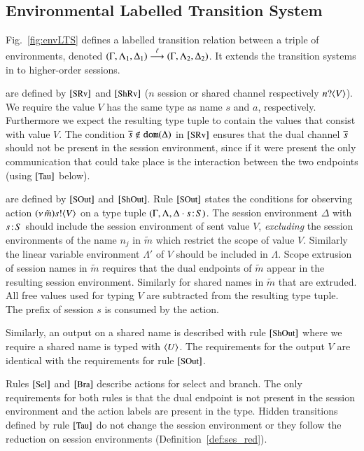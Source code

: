 \subsection{Environmental Labelled Transition System}
\label{ss:elts}
\noi 
Fig.~\ref{fig:envLTS}
defines a labelled transition relation between 
a triple of environments, 
denoted
$(\Gamma, \Lambda_1, \Delta_1) \stackrel{\ell}{\longrightarrow} (\Gamma, \Lambda_2, \Delta_2)$.
It extends the transition systems
in \cite{DBLP:conf/forte/KouzapasYH11,KY13,dkphdthesis} 
to higher-order sessions. 

are defined by 
$\eltsrule{SRv}$ and $\eltsrule{ShRv}$
($n$ session or shared channel respectively $n ? \langle V \rangle$). 
We require the value $V$ has
the same type as name $s$ and $a$, respectively.  Furthermore we
expect the resulting type tuple to contain the values that consist
with value $V$. The condition $\overline{s} \notin \mathtt{dom}(\Delta)$
in $\eltsrule{SRv}$ ensures that 
the dual channel $\overline{s}$ should not be
present in the session environment, since if it were present
the only communication that could take place is the interaction
between the two endpoints (using $\eltsrule{Tau}$ below).

 are defined by $\eltsrule{SOut}$
and $\eltsrule{ShOut}$.  
Rule $\eltsrule{SOut}$ states the conditions for observing action
$(\nu\, \tilde{m}) s ! \langle V \rangle$ on a type tuple 
$(\Gamma, \Lambda, \Delta\cdot s \! : \! S)$. 
The session environment $\Delta$ with $s \! : \! S$ 
should include the session environment of sent value $V$, 
{\em excluding} the session environments of the name $n_j$ 
in $\tilde{m}$ which restrict the scope of value $V$. 
Similarly the linear variable environment 
$\Lambda'$ of $V$ should be included in $\Lambda$. 
Scope extrusion of session names in $\tilde{m}$ requires
that the dual endpoints of $\tilde{m}$ appear in
the resulting session environment. Similarly for shared 
names in $\tilde{m}$ that are extruded.  
All free values used for typing $V$ are subtracted from the
resulting type tuple. The prefix of session $s$ is consumed
by the action.

Similarly, an output on a shared name is described
with rule $\eltsrule{ShOut}$ where we require a shared name
is typed with $\langle U \rangle$. The requirements for
the output $V$ are identical with the requirements for
rule $\eltsrule{SOut}$.

Rules $\eltsrule{Sel}$ and $\eltsrule{Bra}$ describe actions for
select and branch. The only requirements for both
rules is that the dual endpoint is not present in the session
environment and the action labels are present
in the type.
Hidden transitions defined by rule $\eltsrule{Tau}$ 
do not change the session environment
or they follow the reduction on session
environments (Definition~\ref{def:ses_red}). 


